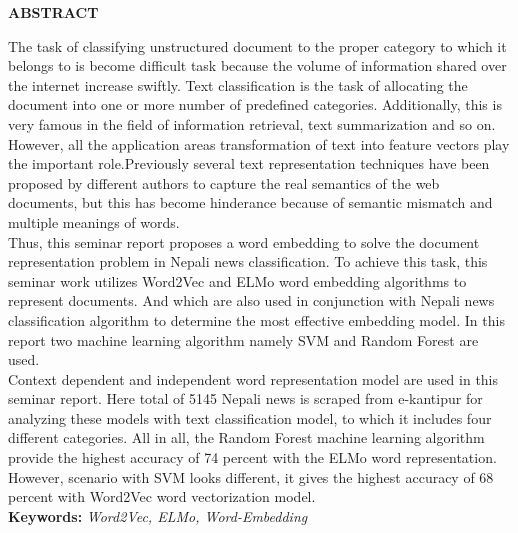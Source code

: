 \documentclass[a4paper, 12pt]{report}
\begin{document}
\clearpage
\begin{center}
\textbf{\LARGE ABSTRACT}
%
\end{center}
\vspace{20pt}
The task of classifying unstructured document to the proper category to which it belongs to is become difficult task because the volume of information shared over the internet increase swiftly. Text classification is the task of allocating the document into one or more number of predefined categories. Additionally, this is very famous in the field of information retrieval, text summarization and so on. However, all the application areas transformation of text into feature vectors play the important role.Previously several text representation techniques have been proposed by different authors to capture the real semantics of the web documents, but this has become hinderance because of semantic mismatch and multiple meanings of words.\\
Thus, this seminar report proposes a word embedding to solve the document representation problem in Nepali news classification. To achieve this task, this seminar work utilizes Word2Vec and ELMo word embedding algorithms to represent documents. And which are also used in conjunction with Nepali news classification algorithm to determine the most effective embedding model. In this report two machine learning algorithm namely SVM and Random Forest are used.\\
Context dependent and independent word representation model are used in this seminar report. Here total of 5145 Nepali news is scraped from e-kantipur for analyzing these models with text classification model, to which it includes four different categories. All in all, the Random Forest machine learning algorithm provide the highest accuracy of 74 percent with the ELMo word representation. However, scenario with SVM looks different, it gives the highest accuracy of 68 percent with Word2Vec word vectorization model.\\
\textbf{Keywords:}
\textit{Word2Vec, ELMo, Word-Embedding}


\hypersetup{linkcolor=black}
\tableofcontents
{}%

  

\listoffigures
{}%
\listoftables
{}%
\end{document}
